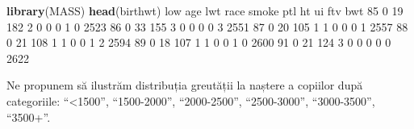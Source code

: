 \documentclass[]{article}
\newenvironment{Shaded}{\begin{snugshade}}{\end{snugshade}}
\newcommand{\KeywordTok}[1]{\textcolor[rgb]{0.13,0.29,0.53}{\textbf{#1}}}
\newcommand{\DataTypeTok}[1]{\textcolor[rgb]{0.13,0.29,0.53}{#1}}
\newcommand{\DecValTok}[1]{\textcolor[rgb]{0.00,0.00,0.81}{#1}}
\newcommand{\FloatTok}[1]{\textcolor[rgb]{0.00,0.00,0.81}{#1}}
\newcommand{\StringTok}[1]{\textcolor[rgb]{0.31,0.60,0.02}{#1}}
\newcommand{\OperatorTok}[1]{\textcolor[rgb]{0.81,0.36,0.00}{\textbf{#1}}}
\newcommand{\NormalTok}[1]{#1}
\begin{document}
\begin{Shaded}
\begin{Highlighting}[]
\KeywordTok{library}\NormalTok{(MASS)}
\KeywordTok{head}\NormalTok{(birthwt)}
\NormalTok{   low age lwt race smoke ptl ht ui ftv  bwt}
\DecValTok{85}   \DecValTok{0}  \DecValTok{19} \DecValTok{182}    \DecValTok{2}     \DecValTok{0}   \DecValTok{0}  \DecValTok{0}  \DecValTok{1}   \DecValTok{0} \DecValTok{2523}
\DecValTok{86}   \DecValTok{0}  \DecValTok{33} \DecValTok{155}    \DecValTok{3}     \DecValTok{0}   \DecValTok{0}  \DecValTok{0}  \DecValTok{0}   \DecValTok{3} \DecValTok{2551}
\DecValTok{87}   \DecValTok{0}  \DecValTok{20} \DecValTok{105}    \DecValTok{1}     \DecValTok{1}   \DecValTok{0}  \DecValTok{0}  \DecValTok{0}   \DecValTok{1} \DecValTok{2557}
\DecValTok{88}   \DecValTok{0}  \DecValTok{21} \DecValTok{108}    \DecValTok{1}     \DecValTok{1}   \DecValTok{0}  \DecValTok{0}  \DecValTok{1}   \DecValTok{2} \DecValTok{2594}
\DecValTok{89}   \DecValTok{0}  \DecValTok{18} \DecValTok{107}    \DecValTok{1}     \DecValTok{1}   \DecValTok{0}  \DecValTok{0}  \DecValTok{1}   \DecValTok{0} \DecValTok{2600}
\DecValTok{91}   \DecValTok{0}  \DecValTok{21} \DecValTok{124}    \DecValTok{3}     \DecValTok{0}   \DecValTok{0}  \DecValTok{0}  \DecValTok{0}   \DecValTok{0} \DecValTok{2622}
\end{Highlighting}
\end{Shaded}

Ne propunem să ilustrăm distribuția greutății la naștere a copiilor după
categoriile: ``\textless{}1500'', ``1500-2000'', ``2000-2500'',
``2500-3000'', ``3000-3500'', ``3500+''.

\begin{Shaded}
\end{Shaded}
\end{document}
